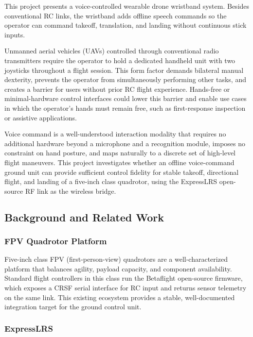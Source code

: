 This project presents a voice-controlled wearable drone wristband system.
Besides conventional RC links, the wristband adds offline speech commands so the operator can command
takeoff, translation, and landing without continuous stick inputs.

Unmanned aerial vehicles (UAVs) controlled through conventional radio transmitters require
the operator to hold a dedicated handheld unit with two joysticks throughout a flight session.
This form factor demands bilateral manual dexterity, prevents the operator from simultaneously
performing other tasks, and creates a barrier for users without prior RC flight experience.
Hands-free or minimal-hardware control interfaces could lower this barrier and enable use
cases in which the operator's hands must remain free, such as first-response inspection or
assistive applications.

Voice command is a well-understood interaction modality that requires no additional hardware
beyond a microphone and a recognition module, imposes no constraint on hand posture, and
maps naturally to a discrete set of high-level flight maneuvers.
This project investigates whether an offline voice-command ground unit can provide sufficient
control fidelity for stable takeoff, directional flight, and landing of a five-inch class quadrotor,
using the ExpressLRS open-source RF link as the wireless bridge.

\subsection{Background and Related Work}

\subsubsection{FPV Quadrotor Platform}

Five-inch class FPV (first-person-view) quadrotors are a well-characterized platform that
balances agility, payload capacity, and component availability.
Standard flight controllers in this class run the Betaflight open-source firmware, which exposes
a CRSF serial interface for RC input and returns sensor telemetry on the same link.
This existing ecosystem provides a stable, well-documented integration target for the ground
control unit.

\subsubsection{ExpressLRS}

